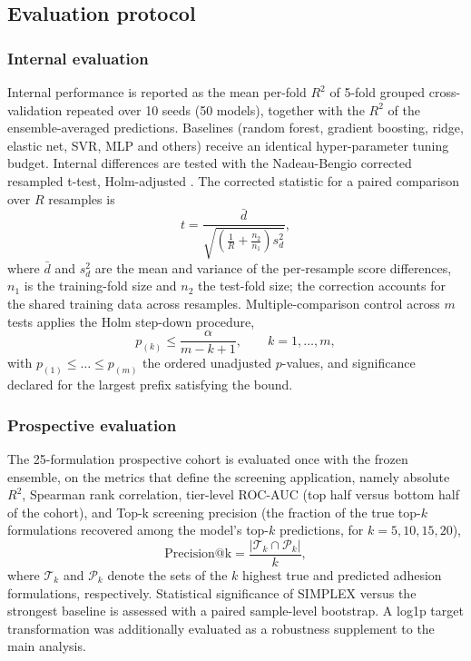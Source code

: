\documentclass[utf8]{FrontiersinHarvard}
\begin{document}
\subsection{Evaluation protocol}

\subsubsection{Internal evaluation}
Internal performance is reported as the mean per-fold $R^2$ of 5-fold grouped cross-validation repeated over 10 seeds (50 models), together with the $R^2$ of the ensemble-averaged predictions. Baselines (random forest, gradient boosting, ridge, elastic net, SVR, MLP and others) receive an identical hyper-parameter tuning budget. Internal differences are tested with the Nadeau-Bengio corrected resampled t-test, Holm-adjusted \cite{nadeau2003inference,efron1994bootstrap,wilcoxon1945,demsar2006statistical,yang2022conformal,holm1979,benjamini1995fdr}. The corrected statistic for a paired comparison over $R$ resamples is
\begin{equation}
t = \frac{\bar{d}}{\sqrt{ \left( \frac{1}{R} + \frac{n_2}{n_1} \right) s_d^2 }},
\label{eq:nadeau}
\end{equation}
where $\bar{d}$ and $s_d^2$ are the mean and variance of the per-resample score differences, $n_1$ is the training-fold size and $n_2$ the test-fold size; the correction accounts for the shared training data across resamples. Multiple-comparison control across $m$ tests applies the Holm step-down procedure,
\begin{equation}
p_{(k)} \le \frac{\alpha}{m - k + 1}, \qquad k = 1, \dots, m,
\label{eq:holm}
\end{equation}
with $p_{(1)} \le \dots \le p_{(m)}$ the ordered unadjusted $p$-values, and significance declared for the largest prefix satisfying the bound.

\subsubsection{Prospective evaluation}
The 25-formulation prospective cohort is evaluated once with the frozen ensemble, on the metrics that define the screening application, namely absolute $R^2$, Spearman rank correlation, tier-level ROC-AUC (top half versus bottom half of the cohort), and Top-k screening precision (the fraction of the true top-$k$ formulations recovered among the model's top-$k$ predictions, for $k=5,10,15,20$),
\begin{equation}
\mathrm{Precision@k} = \frac{ \left| \mathcal{T}_k \cap \mathcal{P}_k \right| }{k},
\label{eq:topk}
\end{equation}
where $\mathcal{T}_k$ and $\mathcal{P}_k$ denote the sets of the $k$ highest true and predicted adhesion formulations, respectively. Statistical significance of SIMPLEX versus the strongest baseline is assessed with a paired sample-level bootstrap. A log1p target transformation was additionally evaluated as a robustness supplement to the main analysis.
\end{document}
